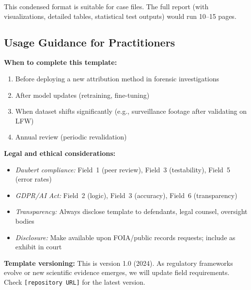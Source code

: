 This condensed format is suitable for case files. The full report (with visualizations, detailed tables, statistical test outputs) would run 10--15 pages.

\subsection{Usage Guidance for Practitioners}

\textbf{When to complete this template:}
\begin{enumerate}
\item Before deploying a new attribution method in forensic investigations
\item After model updates (retraining, fine-tuning)
\item When dataset shifts significantly (e.g., surveillance footage after validating on LFW)
\item Annual review (periodic revalidation)
\end{enumerate}

\textbf{Legal and ethical considerations:}
\begin{itemize}
\item \textit{Daubert compliance:} Field~1 (peer review), Field~3 (testability), Field~5 (error rates)
\item \textit{GDPR/AI Act:} Field~2 (logic), Field~3 (accuracy), Field~6 (transparency)
\item \textit{Transparency:} Always disclose template to defendants, legal counsel, oversight bodies
\item \textit{Disclosure:} Make available upon FOIA/public records requests; include as exhibit in court
\end{itemize}

\textbf{Template versioning:} This is version 1.0 (2024). As regulatory frameworks evolve or new scientific evidence emerges, we will update field requirements. Check \texttt{[repository URL]} for the latest version.
